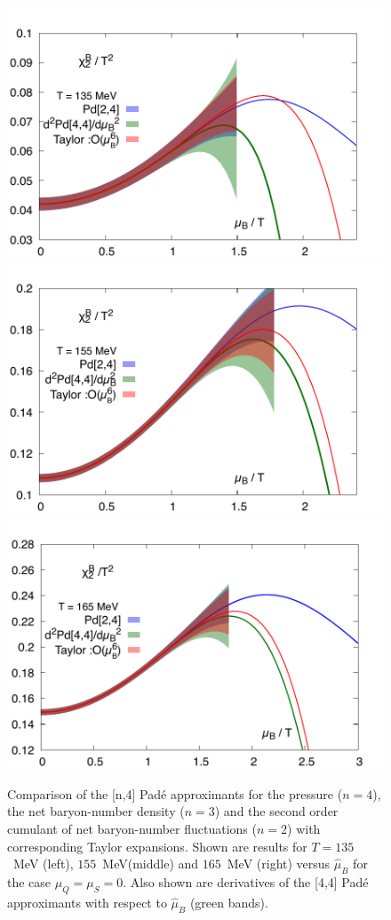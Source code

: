 \documentclass[pdflatex,prd,twocolumn,showpacs,superscriptaddress,nofootinbib]{revtex4-1}
\newcommand \hmu {\hat{\mu}}
\begin{document}
\begin{figure}[ht]
\includegraphics[scale=0.35]{fig/Pade_chiB2_T135.pdf}
\includegraphics[scale=0.35]{fig/Pade_chiB2_T155.pdf}
\includegraphics[scale=0.35]{fig/Pade_chiB2_T165.pdf}

\caption{Comparison of the [n,4] Pad\'e approximants
for the pressure ($n=4$), the net baryon-number density ($n=3$) and the second order cumulant of net baryon-number fluctuations ($n=2$) with corresponding
Taylor expansions. Shown are results for $T=135$~MeV
(left), $155$~MeV(middle) and  $165$~MeV (right) versus $\hmu_B$ for the case $\mu_Q=\mu_S=0$.
Also shown are derivatives of the [4,4] Pad\'e
approximants with respect to $\hmu_B$ (green bands).
}
\label{fig:padetaylor8}
\end{figure}
\end{document}
